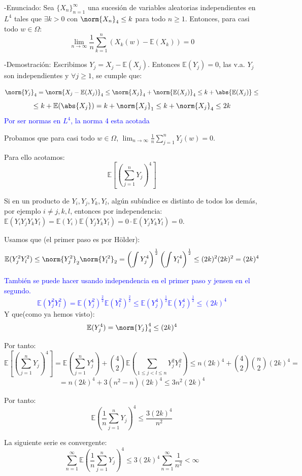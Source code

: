 \documentclass{apuntes}
\begin{document}
-Enunciado: Sea $\{X_n\}_{n=1}^{\infty}$ una sucesión de variables aleatorias independientes en $L^4$ tales que $\exists k>0$ con $\norm{X_n}_4 \leq k$ para todo $n \geq 1$. Entonces, para casi todo $w \in \Omega$:
\[
\lim_{n \rightarrow \infty} \frac{1}{n}\sum_{k=1}^{n}\left( X_k(w) - \mathbb{E}(X_k) \right)= 0
\]


-Demostración: Escribimos $Y_j=X_j-\mathbb{E}(X_j)$. Entonces $\mathbb{E}(Y_j)=0$, las v.a. $Y_j$ son independientes y $\forall j \geq 1$, se cumple que:

\[
\norm{Y_j}_4 = \norm{X_j - \mathbb{E}(X_j)}_4 \leq \norm{X_j}_4 + \norm{\mathbb{E}(X_j)}_4 \leq k + \abs{\mathbb{E}(X_j)} \leq
\]
\[
\leq k + \mathbb{E}(\abs{X_j}) = k + \norm{X_j}_1 \leq k + \norm{X_j}_4 \leq 2k
\]
\textcolor{blue}{Por ser normas en $L^4$, la norma 4 esta acotada}

Probamos que para casi todo $w \in \Omega$, $\lim_{n \rightarrow \infty} \frac{1}{n} \sum_{j=1}^{n}Y_j(w)=0$.

Para ello acotamos:
\[
\mathbb{E}\left[ (\sum_{j=1}^{n} Y_j)^4 \right]
\]

Si en un producto de $Y_i, Y_j, Y_k, Y_l$, algún subíndice es distinto de todos los demás, por ejemplo $i\neq j,k,l$, entonces por independencia: $\mathbb{E}(Y_i Y_j Y_k Y_l)=\mathbb{E}(Y_i)\mathbb{E}(Y_j Y_k Y_l) = 0 \cdot \mathbb{E}(Y_j Y_k Y_l) = 0$.

Usamos que (el primer paso es por Hölder):
\[
\mathbb{E}(Y_j^2 Y_l^2) \leq \norm{Y_j^2}_2 \norm{Y_l^2}_2 = \left( \int Y_j^4\right)^{\frac{1}{2}} \left( \int Y_l^4\right)^{\frac{1}{2}} \leq (2k)^2(2k)^2=(2k)^4
\]

\textcolor{blue}{También se puede hacer usando independencia en el primer paso y jensen en el segundo.
\[
\mathbb{E}(Y_j^2 Y_l^2) = \mathbb{E}(Y_j^2)^\frac{2}{2} \mathbb{E}(Y_l^2)^\frac{2}{2} \leq \mathbb{E}(Y_j^4)^\frac{1}{2}\mathbb{E}(Y_j^4)^\frac{1}{2}\leq(2k)^4
\]
}
Y que(como ya hemos visto):
\[
\mathbb{E}(Y_j^4) = \norm{Y_j}_4^4\leq(2k)^4
\]

Por tanto:
\[
\mathbb{E}\left[(\sum_{j=1}^{n} Y_j)^4\right]= \mathbb{E}(\sum_{j=1}^{n} Y_j^4) + \binom{4}{2}\mathbb{E}(\sum_{1\leq j<l\leq n} Y_j^2 Y_l^2)\leq n(2k)^4 + \binom{4}{2}\binom{n}{2}(2k)^4 =
\]
\[
= n(2k)^4+3(n^2-n)(2k)^4 \leq 3n^2(2k)^4
\]

Por tanto:
\[
\mathbb{E}(\frac{1}{n}\sum_{j=1}^{n}Y_j)^4 \leq \frac{3(2k)^4}{n^2}
\]

La siguiente serie es convergente:
\[
\sum_{n=1}^{\infty}\mathbb{E}(\frac{1}{n}\sum_{j=1}^{n}Y_j)^4 \leq 3(2k)^4 \sum_{n=1}^{\infty}\frac{1}{n^2} < \infty
\]
\end{document}
